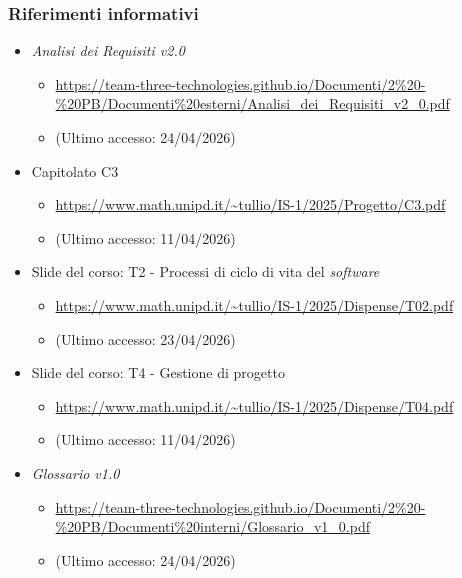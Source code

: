 \documentclass[a4paper,12pt]{article}
\begin{document}
{{            \subsubsection{Riferimenti informativi} {
                \begin{itemize}
                \item \textit{Analisi dei Requisiti v2.0}
                \begin{itemize}
                    \item \url{https://team-three-technologies.github.io/Documenti/2%20-%20PB/Documenti%20esterni/Analisi_dei_Requisiti_v2_0.pdf}
                    \item[] (Ultimo accesso: 24/04/2026)
                \end{itemize}
                \item Capitolato C3
                \begin{itemize}
                    \item \url{https://www.math.unipd.it/~tullio/IS-1/2025/Progetto/C3.pdf}
                    \item[] (Ultimo accesso: 11/04/2026)
                \end{itemize}
                \item Slide del corso: T2 - Processi di ciclo di vita del \textit{software}
                \begin{itemize}
                    \item \url{https://www.math.unipd.it/~tullio/IS-1/2025/Dispense/T02.pdf}
                    \item[] (Ultimo accesso: 23/04/2026)
                \end{itemize}
                \item Slide del corso: T4 - Gestione di progetto
                \begin{itemize}
                    \item \url{https://www.math.unipd.it/~tullio/IS-1/2025/Dispense/T04.pdf}
                    \item[] (Ultimo accesso: 11/04/2026)
                \end{itemize}
                \item \textit{Glossario v1.0}
                \begin{itemize}
                    \item \url{https://team-three-technologies.github.io/Documenti/2%20-%20PB/Documenti%20interni/Glossario_v1_0.pdf}
                    \item[] (Ultimo accesso: 24/04/2026)
                \end{itemize}
            \end{itemize}
            }
        }
    }
    
\end{document}
